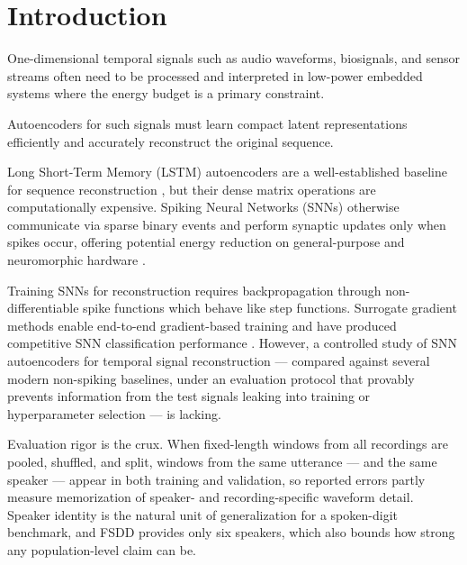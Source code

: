 \documentclass[conference]{IEEEtran}
\begin{document}
\section{Introduction}

\par One-dimensional temporal signals such as audio waveforms, biosignals, and
sensor streams often need to be processed and interpreted in low-power
embedded systems where the energy budget is a primary constraint.

\par Autoencoders for such signals must learn compact latent representations
efficiently and accurately reconstruct the original sequence.

\par Long Short-Term Memory (LSTM) autoencoders are a well-established baseline
for sequence reconstruction \cite{sutskever2014sequence,hochreiter1997long},
but their dense matrix operations are computationally expensive.
Spiking Neural Networks (SNNs) otherwise communicate via sparse binary events and
perform synaptic updates only when spikes occur, offering potential energy
reduction on general-purpose and neuromorphic hardware
\cite{maass1997networks,pfeiffer2018deep,gerstner2002spiking}.

\par Training SNNs for reconstruction requires backpropagation through
non-differentiable spike functions which behave like step functions.
Surrogate gradient methods \cite{neftci2019surrogate,zenke2018superspike} enable
end-to-end gradient-based training and have produced competitive SNN
classification performance \cite{eshraghian2023training,pfeiffer2018deep}.
However, a controlled study of SNN autoencoders for temporal signal
reconstruction --- compared against several modern non-spiking baselines, under
an evaluation protocol that provably prevents information from the test signals
leaking into training or hyperparameter selection --- is lacking.

\par Evaluation rigor is the crux. When fixed-length windows from all recordings
are pooled, shuffled, and split, windows from the same utterance --- and the
same speaker --- appear in both training and validation, so reported errors
partly measure memorization of speaker- and recording-specific waveform detail.
Speaker identity is the natural unit of generalization for a spoken-digit
benchmark, and FSDD provides only six speakers, which also bounds how strong any
population-level claim can be.
\end{document}

